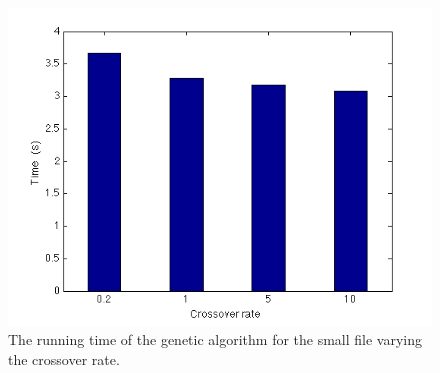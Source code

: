 \documentclass[titlepage,a4paper]{article}
\begin{document}
\begin{figure}[H]
  \begin{center}
    \includegraphics[scale=0.5]{../results/figures/genetic_crossover.png}
  \end{center}
  \caption{The running time of the genetic algorithm for the small file varying the crossover rate.}
  \label{genetic_pop}
\end{figure}

\pagebreak
\end{document}

